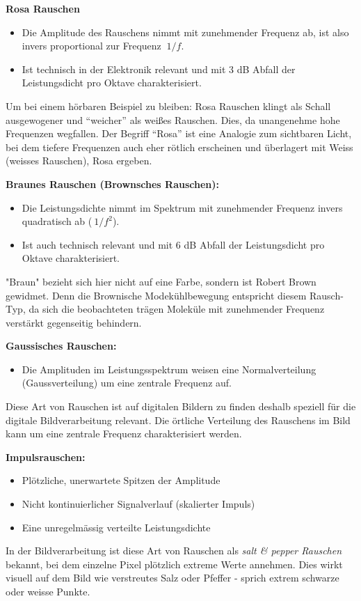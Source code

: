 \begin{definition}{\bf Rosa Rauschen}
	\begin{itemize}
		\item Die Amplitude des Rauschens nimmt mit zunehmender Frequenz ab, ist also invers proportional zur Frequenz $ ~1/f $.
		\item Ist technisch in der Elektronik relevant und mit 3 dB Abfall der Leistungsdicht pro Oktave charakterisiert.
	\end{itemize}
\end{definition}
	Um bei einem hörbaren Beispiel zu bleiben: Rosa Rauschen klingt als Schall ausgewogener und ``weicher'' als weißes Rauschen. Dies, da unangenehme hohe Frequenzen wegfallen. Der Begriff ``Rosa'' ist eine Analogie zum sichtbaren Licht, bei dem tiefere Frequenzen auch eher rötlich erscheinen und überlagert mit Weiss (weisses Rauschen), Rosa ergeben.

\begin{definition}{\bf Braunes Rauschen (Brownsches Rauschen):}
	\begin{itemize}
		\item Die Leistungsdichte nimmt im Spektrum mit zunehmender Frequenz invers quadratisch ab ($ ~1/f^2 $).
		\item Ist auch technisch relevant und mit 6 dB Abfall der Leistungsdicht pro Oktave charakterisiert.
	\end{itemize}
\end{definition}
"Braun" bezieht sich hier nicht auf eine Farbe, sondern ist Robert Brown gewidmet. Denn die Brownische Modekühlbewegung entspricht diesem Rausch-Typ, da sich die beobachteten trägen Moleküle mit zunehmender Frequenz verstärkt gegenseitig behindern.


\begin{definition}{\bf Gaussisches Rauschen:}
	\begin{itemize}
		\item Die Amplituden im Leistungsspektrum weisen eine Normalverteilung (Gaussverteilung) um eine zentrale Frequenz auf.
	\end{itemize}
\end{definition}
Diese Art von Rauschen ist auf digitalen Bildern zu finden deshalb speziell für die digitale Bildverarbeitung relevant. Die örtliche Verteilung des Rauschens im Bild kann um eine zentrale Frequenz charakterisiert werden.

\begin{definition}{\bf Impulsrauschen:}
	\begin{itemize}
		\item Plötzliche, unerwartete Spitzen der Amplitude 
		\item Nicht kontinuierlicher Signalverlauf (skalierter Impuls)
		\item Eine unregelmässig verteilte Leistungsdichte
	\end{itemize}
\end{definition}
In der Bildverarbeitung ist diese Art von Rauschen als \textit{salt \& pepper Rauschen} bekannt, bei dem einzelne Pixel plötzlich extreme Werte annehmen. Dies wirkt visuell auf dem Bild wie verstreutes Salz oder Pfeffer - sprich extrem schwarze oder weisse Punkte.


